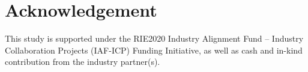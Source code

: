 \documentclass[runningheads]{llncs}
\begin{document}
\section{Acknowledgement}
This study is supported under the RIE2020 Industry Alignment Fund – Industry Collaboration Projects (IAF-ICP) Funding Initiative, as well as cash and in-kind contribution from the industry partner(s).







\begin{comment}
\appendix

\section{Additional Results}
\label{sec:b}

\subsection{Result with Patch Labels}

The LSVQ dataset crops videos into spatial-temporal crops and additionally labels the qualities of crops, while PVQ \cite{pvq} uses these \textit{patch labels} for training and gets better performance. We also use these additional labels for training, by regarding the video crops as independent training videos, the same way as PVQ does. As shown in Tab.~\ref{tab:patches}, the patch labels contribute to performance on cross-dataset scenarios such as KonViD-1k and LIVE-VQC, but reduce the intra-dataset performance on LSVQ. This might be due to the `\textit{patching up}' adds domain gap between the original videos in test set and cropped video patches in training set, but lead to cross-dataset gain due to data augmentation effect. We report the result in our main paper without these additional labels, and will make future explorations on how these patch labels can be better used.



\end{comment}
\end{document}

